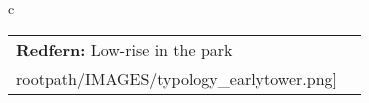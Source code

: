 \begin{table}[H]
        \begin{tabular}{c}
        \begin{tabular}{m{1.5in} m{2in}}
\textbf{Redfern:} {Low-rise in the park} & \texttt{[image: \\rootpath/IMAGES/typology\_earlytower.png]}
\end{tabular}\end{tabular}
        \end{table}